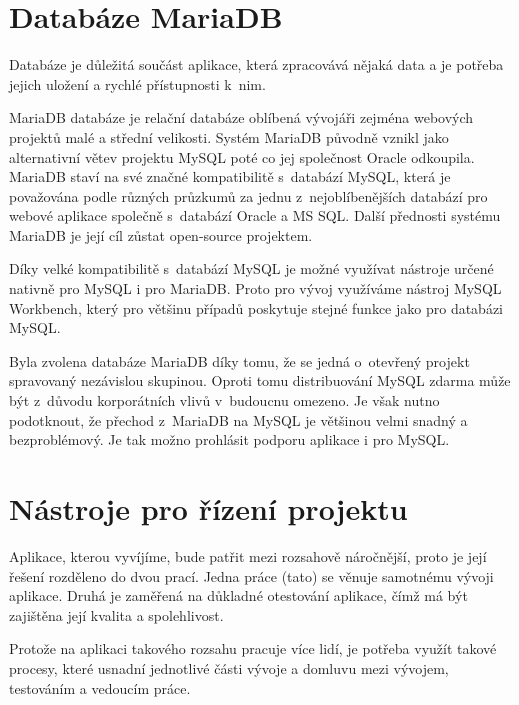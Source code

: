 \documentclass[czech,BP]{thesiskiv}
\begin{document}
\section{Databáze MariaDB}
	\par Databáze je důležitá součást aplikace, která zpracovává nějaká data a je potřeba jejich uložení a rychlé přístupnosti k~nim.
	\par MariaDB databáze je relační databáze oblíbená vývojáři zejména webových projektů malé a střední velikosti. Systém MariaDB původně vznikl jako alternativní větev projektu MySQL poté co jej společnost Oracle odkoupila. MariaDB staví na své značné kompatibilitě s~databází MySQL, která je považována podle různých průzkumů za jednu z~nejoblíbenějších databází pro webové aplikace společně s~databází Oracle a MS SQL. Další přednosti systému MariaDB je její cíl zůstat open-source projektem.
	\par Díky velké kompatibilitě s~databází MySQL je možné využívat nástroje určené nativně pro MySQL i pro MariaDB. Proto pro vývoj využíváme nástroj MySQL Workbench, který pro většinu případů poskytuje stejné funkce jako pro databázi MySQL.
	\par Byla zvolena databáze MariaDB díky tomu, že se jedná o~otevřený projekt spravovaný nezávislou skupinou. Oproti tomu distribuování MySQL zdarma může být z~důvodu korporátních vlivů v~budoucnu omezeno. Je však nutno podotknout, že přechod z~MariaDB na MySQL je většinou velmi snadný a bezproblémový. Je tak možno prohlásit podporu aplikace i pro MySQL.
\section{Nástroje pro řízení projektu}
	\par Aplikace, kterou vyvíjíme, bude patřit mezi rozsahově náročnější, proto je její řešení rozděleno do dvou prací. Jedna práce (tato) se věnuje samotnému vývoji aplikace. Druhá je zaměřená na důkladné otestování aplikace, čímž má být zajištěna její kvalita a spolehlivost.
	\par Protože na aplikaci takového rozsahu pracuje více lidí, je potřeba využít takové procesy, které usnadní jednotlivé části vývoje a domluvu mezi vývojem, testováním a vedoucím práce.
\end{document}
